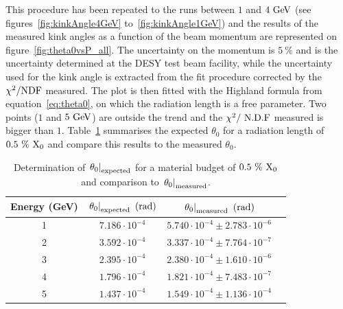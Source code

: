    This procedure has been repeated to the runs between $1$ and $4~\rm{GeV}$ (see figures~\ref{fig:kinkAngle4GeV} to~\ref{fig:kinkAngle1GeV}) and the results of the measured kink angles as a function of the beam momentum are represented on figure~\ref{fig:theta0vsP_all}. 
   The uncertainty on the momentum is $5~\%$ and is the uncertainty determined at the DESY test beam facility, while the uncertainty used for the kink angle is extracted from the fit procedure corrected by the $\chi^2 / \rm{NDF}$ measured.
   The plot is then fitted with the Highland formula from equation~\ref{eq:theta0}, on which the radiation length is a free parameter.
   Two points ($1$ and $5~\rm{GeV}$) are outside the trend and the $\chi^2 /~\rm{N.D.F}$ measured is bigger than $1$.
   Table~\ref{tab:theta0Calcultation} summarises the expected $\theta_0$ for a radiation length of $0.5~\%~\rm{X_0}$ and compare this results to the measured $\theta_0$.

   \begin{table}
     \centering
     \begin{tabular}{c c c c}
        \hline %
        Energy (GeV)	& $\left. \theta_0\right|_{\rm{expected}}~(\rm{rad})$ & $\left. \theta_0\right|_{\rm{measured}}~(\rm{rad})$ \tabularnewline
        \hline %
        \hline %

        	1	  &		$7.186 \cdot 10^{-4}$	  &		$5.740 \cdot 10^{-4} \pm 2.783 \cdot 10^{-6}$	      \tabularnewline
        	2		&		$3.592 \cdot 10^{-4}$	  &		$3.337 \cdot 10^{-4} \pm 7.764 \cdot 10^{-7}$	      \tabularnewline
        	3		&		$2.395 \cdot 10^{-4}$	  &		$2.380 \cdot 10^{-4} \pm 1.610 \cdot 10^{-6}$       \tabularnewline
        	4		&		$1.796 \cdot 10^{-4}$	  &	  $1.821 \cdot 10^{-4} \pm 7.483 \cdot 10^{-7}$       \tabularnewline
        	5		&		$1.437 \cdot 10^{-4}$   &		$1.549 \cdot 10^{-4} \pm 1.136 \cdot 10^{-4}$	      \tabularnewline
        \hline %
     
     \end{tabular}
     \caption{Determination of $\left. \theta_0\right|_{\rm{expected}}$ for a material budget of $0.5~\%~\rm{X_0}$ and comparison to $\left. \theta_0\right|_{\rm{measured}}$.}
     \label{tab:theta0Calcultation}
   \end{table}

